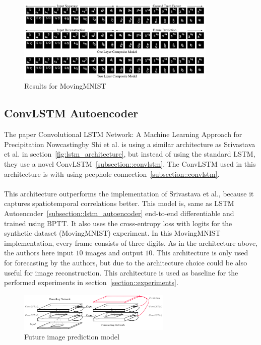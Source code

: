   \begin{figure}[H]
   \includegraphics[width=0.85\textwidth]{../Images/srivastava_results_mnist.png}
   \centering
   \caption{Results for MovingMNIST \cite{Srivastava2015}}
   \label{fig:lstm_results}
  \end{figure}

 \subsection{ConvLSTM Autoencoder} \label{subsection::convlstm_autoencoder}
  The paper \glqq Convolutional LSTM Network: A Machine Learning Approach for Precipitation Nowcasting\grqq by Shi et al. \citep{Shi2015} is using a similar 
  architecture as Srivastava et al. in
  section~\ref{fig:lstm_architecture}, but instead of using the standard LSTM, they use a novel ConvLSTM~\ref{subsection::convlstm}. The ConvLSTM used in this 
  architecture is with using peephole connection~\ref{subsection::convlstm}.
  \\\\
  This architecture outperforms the implementation of Srivastava et al., because it \glqq captures spatiotemporal correlations better\grqq.
  This model is, same as LSTM Autoencoder~\ref{subsection::lstm_autoencoder} end-to-end differentiable and trained using BPTT. It also uses the cross-entropy loss with logits for the synthetic dataset 
  (MovingMNIST) experiment. In this MovingMNIST implementation, every frame consists of three digits. As in the architecture above, the authors here input $10$ images and output $10$. This architecture is only used for forecasting by the authors, but due to the architecture choice could be also useful for image
  reconstruction. This architecture is used as baseline for the performed experiments in section~\ref{section::experiments}.
  \begin{figure}[H]
   \includegraphics[width=0.65\textwidth]{../Images/shi.png}
   \centering
   \caption{Future image prediction model \cite{Shi2015}}
   \label{fig:convlstm_architecture}
  \end{figure}
